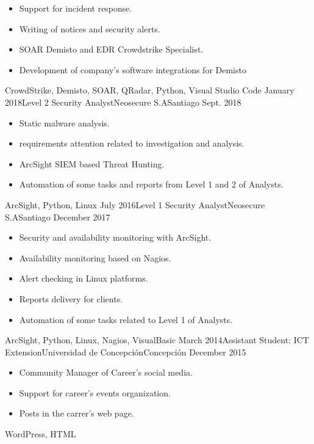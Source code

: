 \begin{experiences}
{\begin{itemize}
        \item Support for incident response.                   
        \item Writing of notices and security alerts.                          
        \item SOAR Demisto and EDR Crowdstrike Specialist.                      
        \item Development of company's software integrations for Demisto                                
      \end{itemize}
    }{CrowdStrike, Demisto, SOAR, QRadar, Python, Visual Studio Code}
  \emptySeparator
  \experience
  {January 2018}{Level 2 Security Analyst}{Neosecure S.A}{Santiago}
  {Sept. 2018}{
    \begin{itemize}
      \item Static malware analysis.
      \item requirements attention related to investigation and analysis.
      \item ArcSight SIEM based Threat Hunting.
      \item Automation of some tasks and reports from Level 1 and 2 of Analysts.
    \end{itemize}
  }{ArcSight, Python, Linux}
  \emptySeparator
  \experience
  {July 2016}{Level 1 Security Analyst}{Neosecure S.A}{Santiago}
  {December 2017}{
    \begin{itemize}
      \item Security and availability monitoring with ArcSight.
      \item Availability monitoring based on Nagios.
      \item Alert checking in Linux platforms.
      \item Reports delivery for clients.
      \item Automation of some tasks related to Level 1 of Analysts.
    \end{itemize}
  }{ArcSight, Python, Linux, Nagios, VisualBasic}
  \emptySeparator
  \experience
  {March 2014}{Assistant Student: ICT Extension}{Universidad de Concepción}{Concepción}
  {December 2015}{
    \begin{itemize}
      \item Community Manager of Career's social media.
      \item Support for career's events organization.
      \item Posts in the carrer's web page.
    \end{itemize}
  }{WordPress, HTML}
  \emptySeparator

\end{experiences}
